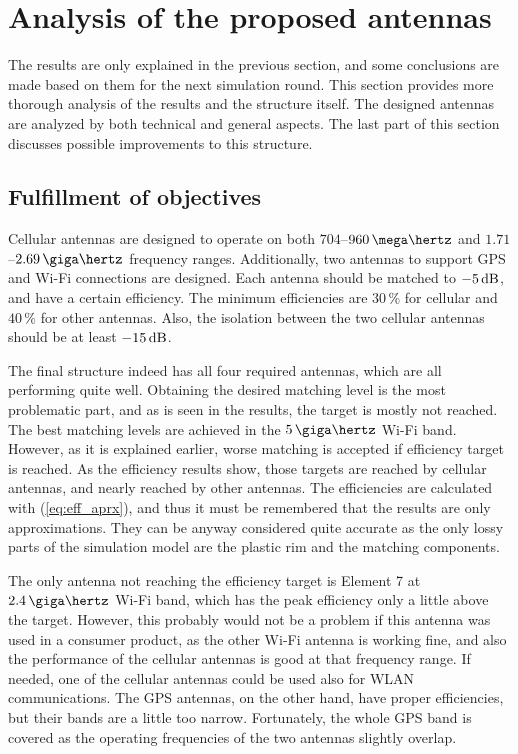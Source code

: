 \section{Analysis of the proposed antennas}
\label{sec:analysis}
The results are only explained in the previous section, and some conclusions are made based on them for the next simulation round. This section provides more thorough analysis of the results and the structure itself. The designed antennas are analyzed by both technical and general aspects. The last part of this section discusses possible improvements to this structure.

\vspace{-7pt}
\subsection{Fulfillment of objectives}
\label{sec:fulfillment}
\vspace{-3pt}
Cellular antennas are designed to operate on both $704$--$960\,\mega\hertz$ and $1.71$--$2.69\,\giga\hertz$ frequency ranges. Additionally, two antennas to support GPS and Wi-Fi connections are designed. Each antenna should be matched to $-5\,\mathrm{dB}$, and have a certain efficiency. The minimum efficiencies are $30\,\%$ for cellular and $40\,\%$ for other antennas. Also, the isolation between the two cellular antennas should be at least $-15\,\mathrm{dB}$.

The final structure indeed has all four required antennas, which are all performing quite well. Obtaining the desired matching level is the most problematic part, and as is seen in the results, the target is mostly not reached. The best matching levels are achieved in the $5\,\giga\hertz$ Wi-Fi band. However, as it is explained earlier, worse matching is accepted if efficiency target is reached. As the efficiency results show, those targets are reached by cellular antennas, and nearly reached by other antennas. The efficiencies are calculated with (\ref{eq:eff_aprx}), and thus it must be remembered that the results are only approximations. They can be anyway considered quite accurate as the only lossy parts of the simulation model are the plastic rim and the matching components. 

The only antenna not reaching the efficiency target is Element 7 at $2.4\,\giga\hertz$ Wi-Fi band, which has the peak efficiency only a little above the target. However, this probably would not be a problem if this antenna was used in a consumer product, as the other Wi-Fi antenna is working fine, and also the performance of the cellular antennas is good at that frequency range. If needed, one of the cellular antennas could be used also for WLAN communications. The GPS antennas, on the other hand, have proper efficiencies, but their bands are a little too narrow. Fortunately, the whole GPS band is covered as the operating frequencies of the two antennas slightly overlap.

